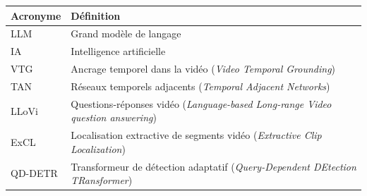 \begin{center}
    \begin{tabular}{ll}
    \toprule
    \textbf{Acronyme} & \textbf{Définition} \\ \midrule
    LLM  & Grand modèle de langage   \\
    IA  & Intelligence artificielle   \\
    VTG  & Ancrage temporel dans la vidéo (\textit{Video Temporal Grounding})  \\
    TAN  & Réseaux temporels adjacents (\textit{Temporal Adjacent Networks}) \\
    LLoVi  & Questions-réponses vidéo (\textit{Language-based Long-range Video question answering})  \\
    ExCL  & Localisation extractive de segments vidéo (\textit{Extractive Clip Localization}) \\
    QD-DETR  & Transformeur de détection adaptatif (\textit{Query-Dependent DEtection TRansformer})  \\
    \bottomrule
    \end{tabular}
    \end{center}
    